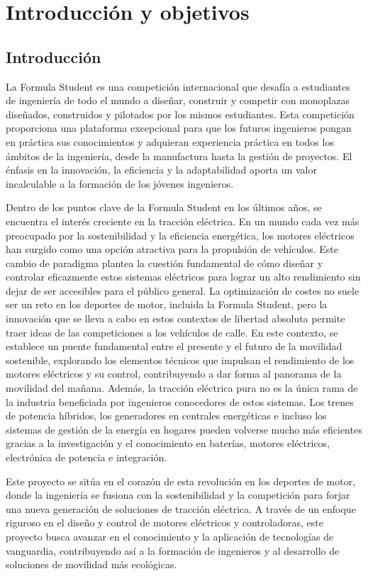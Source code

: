 \chapter{Introducción y objetivos}

\section{Introducción}
La Formula Student es una competición internacional que desafía a estudiantes de ingeniería de todo el mundo a diseñar, construir y competir con monoplazas diseñados, construidos y pilotados por los mismos estudiantes. Esta competición proporciona una plataforma excepcional para que los futuros ingenieros pongan en práctica sus conocimientos y adquieran experiencia práctica en todos los ámbitos de la ingeniería, desde la manufactura hasta la gestión de proyectos. El énfasis en la innovación, la eficiencia y la adaptabilidad aporta un valor incalculable a la formación de los jóvenes ingenieros.

Dentro de los puntos clave de la Formula Student en los últimos años, se encuentra el interés creciente en la tracción eléctrica. En un mundo cada vez más preocupado por la sostenibilidad y la eficiencia energética, los motores eléctricos han surgido como una opción atractiva para la propulsión de vehículos. Este cambio de paradigma plantea la cuestión fundamental de cómo diseñar y controlar eficazmente estos sistemas eléctricos para lograr un alto rendimiento sin dejar de ser accesibles para el público general. La optimización de costes no suele ser un reto en los deportes de motor, incluida la Formula Student, pero la innovación que se lleva a cabo en estos contextos de libertad absoluta permite traer ideas de las competiciones a los vehículos de calle. En este contexto, se establece un puente fundamental entre el presente y el futuro de la movilidad sostenible, explorando los elementos técnicos que impulsan el rendimiento de los motores eléctricos y su control, contribuyendo a dar forma al panorama de la movilidad del mañana. Además, la tracción eléctrica pura no es la única rama de la industria beneficiada por ingenieros conocedores de estos sistemas. Los trenes de potencia híbridos, los generadores en centrales energéticas e incluso los sistemas de gestión de la energía en hogares pueden volverse mucho más eficientes gracias a la investigación y el conocimiento en baterías, motores eléctricos, electrónica de potencia e integración.

Este proyecto se sitúa en el corazón de esta revolución en los deportes de motor, donde la ingeniería se fusiona con la sostenibilidad y la competición para forjar una nueva generación de soluciones de tracción eléctrica. A través de un enfoque riguroso en el diseño y control de motores eléctricos y controladoras, este proyecto busca avanzar en el conocimiento y la aplicación de tecnologías de vanguardia, contribuyendo así a la formación de ingenieros y al desarrollo de soluciones de movilidad más ecológicas.

